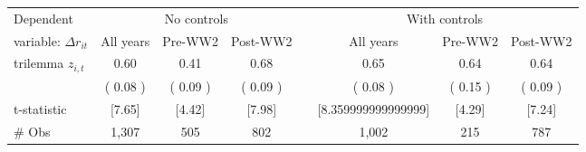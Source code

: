 \begin{tabular}{lccccccc}
\toprule
Dependent & \multicolumn{3}{c}{No controls} && \multicolumn{3}{c}{With controls} \\  \cline{2-4} \cline{6-8}
variable: $\Delta r_{it}$                    &\multicolumn{1}{c}{All years}&\multicolumn{1}{c}{Pre-WW2}&\multicolumn{1}{c}{Post-WW2}& &\multicolumn{1}{c}{All years}&\multicolumn{1}{c}{Pre-WW2}&\multicolumn{1}{c}{Post-WW2}\\
\midrule
trilemma $ z_{i,t}$ &   0.60\sym{***} &   0.41\sym{***} &   0.68\sym{***} &&   0.65\sym{***} &   0.64\sym{***} &   0.64\sym{***} \\
& (  0.08 ) & (  0.09 ) & (  0.09 ) && (  0.08 ) & (  0.15 ) & (  0.09 )   \\
t-statistic & [7.65] & [4.42] & [7.98] && [8.359999999999999] & [4.29] & [7.24] \\
\# Obs &        1,307 &          505 &          802 & &        1,002 &          215 &          787 \\
\bottomrule
\end{tabular}
